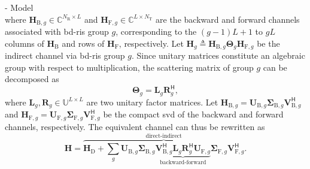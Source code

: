 \documentclass[journal]{IEEEtran}
\begin{document}
\begin{section}{- Model}
\begin{equation}
		\label{eq:channel_equivalent}
	\end{equation}
	where $\mathbf{H}_{\mathrm{B},g} \in \mathbb{C}^{N_\mathrm{R} \times L}$ and $\mathbf{H}_{\mathrm{F},g} \in \mathbb{C}^{L \times N_\mathrm{T}}$ are the backward and forward channels associated with \gls{bd}-\gls{ris} group $g$, corresponding to the $(g{-}1)L{+}1$ to $gL$ columns of $\mathbf{H}_\mathrm{B}$ and rows of $\mathbf{H}_\mathrm{F}$, respectively.
	Let $\mathbf{H}_g \triangleq \mathbf{H}_{\mathrm{B},g} \mathbf{\Theta}_g \mathbf{H}_{\mathrm{F},g}$ be the indirect channel via \gls{bd}-\gls{ris} group $g$.
	Since unitary matrices constitute an algebraic group with respect to multiplication, the scattering matrix of group $g$ can be decomposed as
	\begin{equation}
		\mathbf{\Theta}_g = \mathbf{L}_g \mathbf{R}_g^\mathsf{H},
	\end{equation}
	where $\mathbf{L}_g, \mathbf{R}_g \in \mathbb{U}^{L \times L}$ are two unitary factor matrices.
	Let $\mathbf{H}_{\mathrm{B},g} = \mathbf{U}_{\mathrm{B},g} \mathbf{\Sigma}_{\mathrm{B},g} \mathbf{V}_{\mathrm{B},g}^\mathsf{H}$ and $\mathbf{H}_{\mathrm{F},g} = \mathbf{U}_{\mathrm{F},g} \mathbf{\Sigma}_{\mathrm{F},g} \mathbf{V}_{\mathrm{F},g}^\mathsf{H}$ be the compact \gls{svd} of the backward and forward channels, respectively.
	The equivalent channel can thus be rewritten as
	\begin{equation}
		\mathbf{H} = \overbrace{\mathbf{H}_\mathrm{D} + \sum_g \mathbf{U}_{\mathrm{B},g} \mathbf{\Sigma}_{\mathrm{B},g} \underbrace{\mathbf{V}_{\mathrm{B},g}^\mathsf{H} \mathbf{L}_g \mathbf{R}_g^\mathsf{H} \mathbf{U}_{\mathrm{F},g}}_\text{backward-forward} \mathbf{\Sigma}_{\mathrm{F},g} \mathbf{V}_{\mathrm{F},g}^\mathsf{H}}^\text{direct-indirect}.
		\label{eq:channel_equivalent_svd}
	\end{equation}


\end{section}
\end{document}
